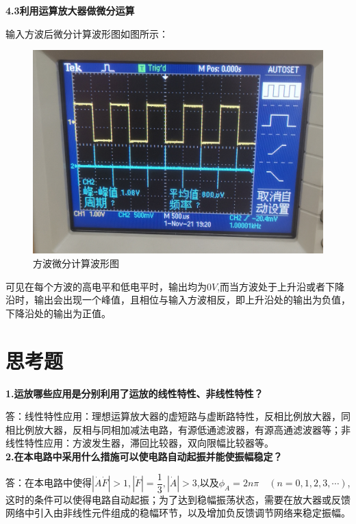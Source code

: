 \documentclass[a4 paper,12pt]{article}
\begin{document}
\noindent
\textbf{4.3\quad 利用运算放大器做微分运算}
\par 输入方波后微分计算波形图如图所示：
		\begin{figure}[H]
		\centering
		\hspace{2em}\includegraphics[width=.4\linewidth]{pic/3.jpg}
		\caption{\small{方波微分计算波形图}
		}
	\end{figure}
    \par 可见在每个方波的高电平和低电平时，输出均为$0V$,而当方波处于上升沿或者下降沿时，输出会出现一个峰值，且相位与输入方波相反，即上升沿处的输出为负值，下降沿处的输出为正值。
	\section{思考题}
	\noindent
	\textbf{1.运放哪些应用是分别利用了运放的线性特性、非线性特性？
}
	\par 答：线性特性应用：理想运算放大器的虚短路与虚断路特性，反相比例放大器，同相比例放大器，反相与同相加减法电路，有源低通滤波器，有源高通滤波器等；非线性特性应用：方波发生器，滞回比较器，双向限幅比较器等。\\
    \textbf{2.在本电路中采用什么措施可以使电路自动起振并能使振幅稳定？}
    \par 答：在本电路中使得$|\dot{A}\dot{F}|>1,|\dot{F}|=\dfrac{1}{3},|\dot{A}|>3$,以及$\phi_{A}=2n\pi \quad(n=0,1,2,3,\cdots)$,这时的条件可以使得电路自动起振；为了达到稳幅振荡状态，需要在放大器或反馈网络中引入由非线性元件组成的稳幅环节，以及增加负反馈调节网络来稳定振幅。
\end{document}
